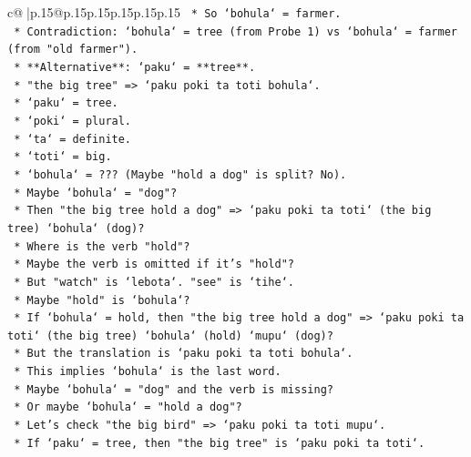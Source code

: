 \documentclass{article}
\begin{document}
{\begin{supertabular}{c@{$\;$}|p{.15\linewidth}@{}p{.15\linewidth}p{.15\linewidth}p{.15\linewidth}p{.15\linewidth}p{.15\linewidth}}
{{{\texttt{                            *   So `bohula` = farmer.} \\
\texttt{                            *   Contradiction: `bohula` = tree (from Probe 1) vs `bohula` = farmer (from "old farmer").} \\
\texttt{                *   **Alternative**: `paku` = **tree**.} \\
\texttt{                    *   "the big tree" => `paku poki ta toti bohula`.} \\
\texttt{                        *   `paku` = tree.} \\
\texttt{                        *   `poki` = plural.} \\
\texttt{                        *   `ta` = definite.} \\
\texttt{                        *   `toti` = big.} \\
\texttt{                        *   `bohula` = ??? (Maybe "hold a dog" is split? No).} \\
\texttt{                        *   Maybe `bohula` = "dog"?} \\
\texttt{                        *   Then "the big tree hold a dog" => `paku poki ta toti` (the big tree) `bohula` (dog)?} \\
\texttt{                        *   Where is the verb "hold"?} \\
\texttt{                        *   Maybe the verb is omitted if it's "hold"?} \\
\texttt{                        *   But "watch" is `lebota`. "see" is `tihe`.} \\
\texttt{                        *   Maybe "hold" is `bohula`?} \\
\texttt{                        *   If `bohula` = hold, then "the big tree hold a dog" => `paku poki ta toti` (the big tree) `bohula` (hold) `mupu` (dog)?} \\
\texttt{                        *   But the translation is `paku poki ta toti bohula`.} \\
\texttt{                        *   This implies `bohula` is the last word.} \\
\texttt{                        *   Maybe `bohula` = "dog" and the verb is missing?} \\
\texttt{                        *   Or maybe `bohula` = "hold a dog"?} \\
\texttt{                    *   Let's check "the big bird" => `paku poki ta toti mupu`.} \\
\texttt{                        *   If `paku` = tree, then "the big tree" is `paku poki ta toti`.} \\
}}}
\end{supertabular}}
\end{document}
